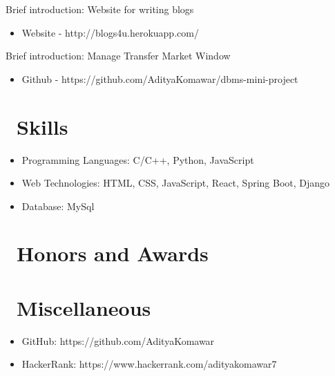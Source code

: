 \documentclass{resume}
\begin{document}
Brief introduction: Website for writing blogs
\begin{itemize}
  \item Website - http://blogs4u.herokuapp.com/
\end{itemize}

Brief introduction: Manage Transfer Market Window
\begin{itemize}
  \item Github - https://github.com/AdityaKomawar/dbms-mini-project
\end{itemize}


\section{\faCogs\ Skills}
\begin{itemize}[parsep=0.5ex]
  \item Programming Languages: C/C++, Python, JavaScript
  \item Web Technologies: HTML, CSS, JavaScript, React, Spring Boot, Django
  \item Database: MySql
\end{itemize}

\section{\faHeartO\ Honors and Awards}

\section{\faInfo\ Miscellaneous}
\begin{itemize}[parsep=0.5ex]
  \item GitHub: https://github.com/AdityaKomawar
  \item HackerRank: https://www.hackerrank.com/adityakomawar7
\end{itemize}

%
%
\end{document}
